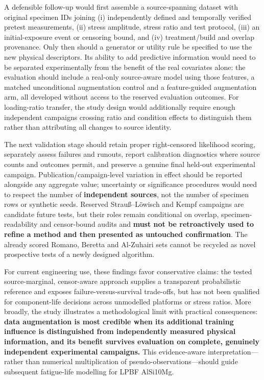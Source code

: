 \documentclass[12pt,a4paper]{article}
\begin{document}
A defensible follow-up would first assemble a source-spanning dataset with original specimen IDs joining (i) independently defined and temporally verified pretest measurements, (ii) stress amplitude, stress ratio and test protocol, (iii) an initial-exposure event or censoring bound, and (iv) treatment/build and overlap provenance. Only then should a generator or utility rule be specified to use the new physical descriptors. Its ability to add predictive information would need to be separated experimentally from the benefit of the real covariates alone: the evaluation should include a real-only source-aware model using those features, a matched unconditional augmentation control and a feature-guided augmentation arm, all developed without access to the reserved evaluation outcomes. For loading-ratio transfer, the study design would additionally require enough independent campaigns crossing ratio and condition effects to distinguish them rather than attributing all changes to source identity.

The next validation stage should retain proper right-censored likelihood scoring, separately assess failures and runouts, report calibration diagnostics where source counts and outcomes permit, and preserve a genuine final held-out experimental campaign. Publication/campaign-level variation in effect should be reported alongside any aggregate value; uncertainty or significance procedures would need to respect the number of \textbf{independent sources}, not the number of specimen rows or synthetic seeds. Reserved Strauß–Löwisch and Kempf campaigns are candidate future tests, but their roles remain conditional on overlap, specimen-readability and censor-bound audits and \textbf{must not be retroactively used to refine a method and then presented as untouched confirmation}. The already scored Romano, Beretta and Al-Zuhairi sets cannot be recycled as novel prospective tests of a newly designed algorithm.

For current engineering use, these findings favor conservative claims: the tested source-marginal, censor-aware approach supplies a transparent probabilistic reference and exposes failure-versus-survival trade-offs, but has not been qualified for component-life decisions across unmodelled platforms or stress ratios. More broadly, the study illustrates a methodological limit with practical consequences: \textbf{data augmentation is most credible when its additional training influence is distinguished from independently measured physical information, and its benefit survives evaluation on complete, genuinely independent experimental campaigns.} This evidence-aware interpretation—rather than numerical multiplication of pseudo-observations—should guide subsequent fatigue-life modelling for LPBF AlSi10Mg.
\end{document}
